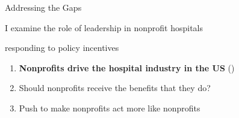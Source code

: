 \documentclass[notes,11pt, aspectratio=169]{beamer}
\newenvironment{wideitemize}{\itemize\addtolength{\itemsep}{10pt}}{\enditemize}
\begin{document}
\begin{frame}{Addressing the Gaps}

    \Large
    \begin{block}{}
    \begin{center}
    I examine the role of leadership in nonprofit hospitals
    
    responding to policy incentives
    \end{center}
    \end{block}


\vspace{10mm} \large \pause

\begin{enumerate}
    \item \textbf{Nonprofits drive the hospital industry in the US} \scriptsize (\cite{ASPE_2023}) 

\vspace{2mm}
    
    \begin{wideitemize}
        \item Should nonprofits receive the benefits that they do? 
        \item Push to make nonprofits act more like nonprofits
    \end{wideitemize}
    \end{enumerate}
\end{frame}

        

\end{document}
